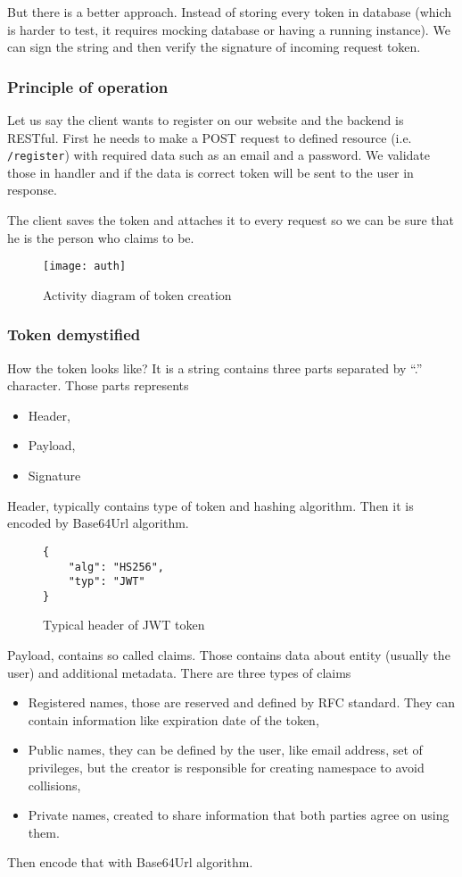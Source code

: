 But there is a better approach. Instead of storing every token in database
(which is harder to test, it requires mocking database or having a running
instance). We can sign the string and then verify the signature of incoming
request token.

\subsubsection{Principle of operation}
Let us say the client wants to register on our website and the backend is
RESTful. First he needs to make a POST request to defined resource (i.e.
\verb|/register|) with required data such as an email and a password. We
validate those in handler and if the data is correct token will be sent to the
user in response.

The client saves the token and attaches it to every request so we can be sure
that he is the person who claims to be.

\clearpage
\begin{figure}[!htbp]
\centering
\texttt{[image: auth]}
\label{fig:auth}
\caption{Activity diagram of token creation}
\end{figure}

\subsubsection{Token demystified}
How the token looks like? It is a string contains three parts separated by
``.'' character\cite{JWT-introduction}. Those parts represents
\begin{itemize}
\item Header,
\item Payload,
\item Signature
\end{itemize}

Header, typically contains type of token and hashing algorithm. Then it is
encoded by Base64Url algorithm.
\begin{figure}[!htbp]
\begin{verbatim}
{
    "alg": "HS256",
    "typ": "JWT"
}
\end{verbatim}
\caption{Typical header of JWT token}
\label{src:typical-header}
\end{figure}

Payload, contains so called claims. Those contains data about entity (usually
the user) and additional metadata. There are three types of claims
\begin{itemize}
\item Registered names, those are reserved and defined by RFC standard. They
  can contain information like expiration date of the token\cite{JWT-rfc},
\item Public names, they can be defined by the user, like email address, set of
  privileges, but the creator is responsible for creating namespace to avoid
  collisions,
\item Private names, created to share information that both parties agree on
  using them.
\end{itemize}
Then encode that with Base64Url algorithm.

